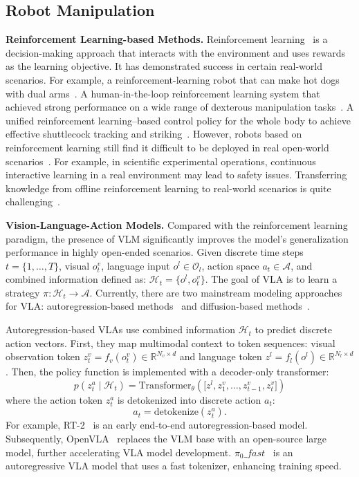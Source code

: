 \documentclass[letterpaper]{article} %
\begin{document}
\subsection{Robot Manipulation}
\textbf{Reinforcement Learning-based Methods.}
Reinforcement learning~\cite{singh2022reinforcement}
is a decision-making approach that interacts with the environment and uses rewards as the learning objective.
It has demonstrated success in certain real-world scenarios. For example, a reinforcement-learning robot that can make hot dogs with dual arms~\cite{li2019formal}. A human-in-the-loop reinforcement learning system that achieved strong performance on a wide range of dexterous manipulation tasks~\cite{luo2025precise}. A unified reinforcement learning–based control policy for the whole body to achieve effective shuttlecock tracking and striking~\cite{ma2025learning}.
However, robots based on reinforcement learning still find it difficult to be deployed in real open-world scenarios~\cite{ghosh2021generalization}. For example, in scientific experimental operations, continuous interactive learning in a real environment may lead to safety issues. Transferring knowledge from offline reinforcement learning to real-world scenarios is quite challenging~\cite{dulac2021challenges}.

\noindent
\textbf{Vision-Language-Action Models.}
Compared with the reinforcement learning paradigm, the presence of VLM
\cite{zhang2024vision,radford2021learning}
significantly improves the model's generalization performance in highly open-ended scenarios.
Given discrete time steps $t = \{1, \dots, T\}$,
visual $o_t^v$, language input $o^l \in \mathcal{O}_l$,
action space $a_t \in \mathcal{A}$, and combined information defined as: $\mathcal{H}_t = \{o^l,o_t^v \}$. The goal of VLA is to learn a strategy $\pi: \mathcal{H}_t \rightarrow \mathcal{A}$. Currently, there are two mainstream modeling approaches for VLA:
autoregression-based methods~\cite{zitkovich2023rt,kim2025openvla}
and diffusion-based methods~\cite{black2024pi_0,liurdt}.

Autoregression-based VLAs use combined information $\mathcal{H}_t$ to predict discrete action vectors. First, they map multimodal context to token sequences: visual observation token $z_t^{v} = f_v(o_t^{v}) \in \mathbb{R}^{N_v \times d}$ and language token $z^{l} = f_l(o^{l}) \in \mathbb{R}^{N_l \times d}$. Then, the policy function is implemented with a decoder-only transformer:
\begin{equation}
    p(z_t^a \mid \mathcal{H}_t) = \mathrm{Transformer}_\theta(\big[ z^{l}, z_1^{v}, \dots, z_{t-1}^{v}, z_t^{v} \big])
\end{equation}
where
the action token $z_t^a$ is detokenized into discrete action $a_t$:
\begin{equation}
    a_t = \mathrm{detokenize}(z_t^a).
\end{equation}
For example, RT-2~\cite{zitkovich2023rt} is an early end-to-end autoregression-based model.
Subsequently, OpenVLA~\cite{kim2025openvla} replaces the VLM base with an open-source large model, further accelerating VLA model development. $\pi_0\_fast$~\cite{pertsch2025fast} is an autoregressive VLA model that uses a fast tokenizer, enhancing training speed.
\end{document}
